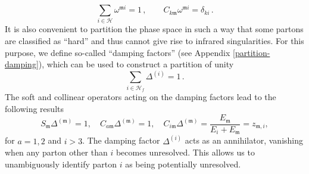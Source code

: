 \documentclass[a4paper, 12pt]{book}
\newcommand{\um}{\mathfrak{m}}
\begin{document}
\begin{equation}
    \sum_{i \in \mathcal{H}} \omega^{\um i} = 1 \, , \qquad C_{k\um}\omega^{\um i} = \delta_{ki} \,.
\end{equation}
It is also convenient to partition the phase space in such a way that some partons are classified as ``hard” and thus cannot give rise to infrared singularities. For this purpose, we define so-called ``damping factors” (see Appendix \ref{partition-damping}), which can be used to construct a partition of unity
\begin{equation}
  \sum_{i \in \mathcal{H}_f} \Delta^{(i)}=1 \, .
\end{equation}
The soft and collinear operators acting on the damping factors lead to the following results
\begin{equation}
S_\um \Delta^{(\um)} = 1, \quad C_{a\um} \Delta^{(\um)} = 1, \quad C_{i\um} \Delta^{(\um)} = \frac{E_\um}{E_i+ E_\um} =z_{\um,i},
\end{equation}
for $a = 1,2$ and $i > 3$. The damping factor $\Delta^{(i)}$ acts as an annihilator, vanishing when any parton other than $i$ becomes unresolved. This allows us to unambiguously identify parton $i$ as being potentially unresolved. \\
\end{document}
